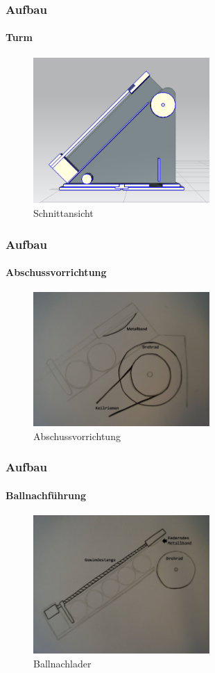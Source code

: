 \begin{frame}
	\frametitle{Aufbau\hfill{}\footnotesize \group}
	\framesubtitle{Turm}
		\begin{figure}
			\centering
			\includegraphics[width=0.6\textwidth]{../../fig/Schnittansicht.png}
			\caption{Schnittansicht}
		\end{figure}
\end{frame}

\begin{frame}
	\frametitle{Aufbau\hfill{}\footnotesize \group}
	\framesubtitle{Abschussvorrichtung}
		\begin{figure}
			\centering
			\includegraphics[width=0.6\textwidth]{../../fig/Drehrad.jpg}
			\caption{Abschussvorrichtung}
		\end{figure}
\end{frame}

\begin{frame}
	\frametitle{Aufbau\hfill{}\footnotesize \group}
	\framesubtitle{Ballnachführung}
		\begin{figure}
			\centering
			\includegraphics[width=0.6\textwidth]{../../fig/Ballnachlader.jpg}
			\caption{Ballnachlader}
		\end{figure}
\end{frame}
